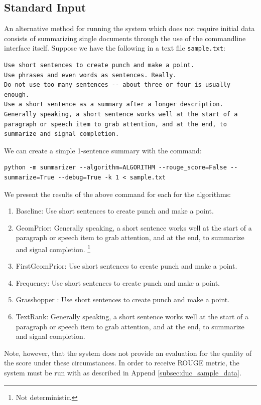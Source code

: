\documentclass[10pt]{article}
\begin{document}
\subsection{Standard Input}
\label{subsec:standard_input}
An alternative method for running the system which does not require initial data consists of summarizing single documents through the use of the commandline interface itself. Suppose we have the following in a text file \verb|sample.txt|:
\begin{lstlisting}[breaklines]
Use short sentences to create punch and make a point.
Use phrases and even words as sentences. Really.
Do not use too many sentences -- about three or four is usually enough.
Use a short sentence as a summary after a longer description.
Generally speaking, a short sentence works well at the start of a paragraph or speech item to grab attention, and at the end, to summarize and signal completion.
\end{lstlisting}
We can create a simple 1-sentence summary with the command:
\begin{lstlisting}[breaklines]
python -m summarizer --algorithm=ALGORITHM --rouge_score=False --summarize=True --debug=True -k 1 < sample.txt
\end{lstlisting}
We present the results of the above command for each for the algorithms:
\begin{enumerate}
\item {\sc Baseline}: Use short sentences to create punch and make a point.
\item {\sc GeomPrior}: Generally speaking, a short sentence works well at the start of a paragraph or speech item to grab attention, and at the end, to summarize and signal completion. \footnote{Not deterministic.}
\item {\sc FirstGeomPrior}: Use short sentences to create punch and make a point.
\item {\sc Frequency}: Use short sentences to create punch and make a point.
\item {\sc Grasshopper }: Use short sentences to create punch and make a point.
\item {\sc TextRank}: Generally speaking, a short sentence works well at the start of a paragraph or speech item to grab attention, and at the end, to summarize and signal completion.
\end{enumerate}
Note, however, that the system does not provide an evaluation for the quality of the score under these circumstances. In order to receive ROUGE metric, the system must be run with as described in Append \ref{subsec:duc_sample_data}.
\end{document}
